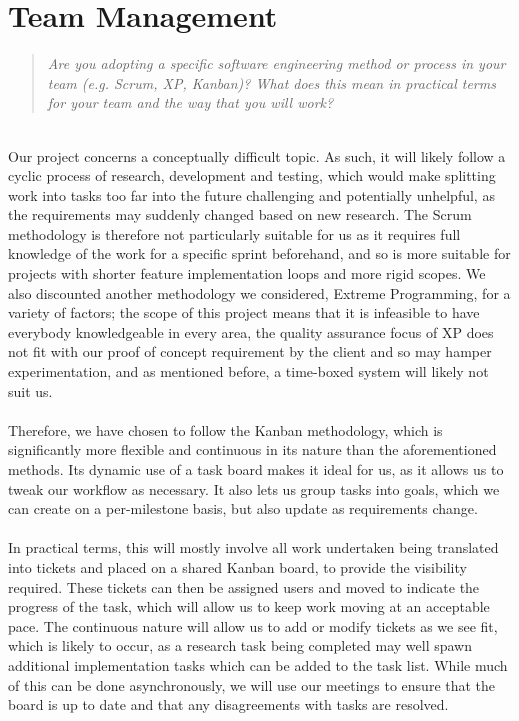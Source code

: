 \documentclass{report}
\newcommand{\teamq}[1]{\begin{quote}
    \large\textit{#1}
\end{quote}}
\begin{document}
\section*{Team Management}
\teamq{Are you adopting a specific software engineering method or process in your team (e.g. Scrum, XP, Kanban)? What does this mean in practical terms for your team and the way that you will work?}
\\
Our project concerns a conceptually difficult topic. As such, it will likely follow a cyclic process of research, development and testing, which would make splitting work into tasks too far into the future challenging and potentially unhelpful, as the requirements may suddenly changed based on new research. The Scrum methodology is therefore not particularly suitable for us as it requires full knowledge of the work for a specific sprint beforehand, and so is more suitable for projects with shorter feature implementation loops and more rigid scopes. We also discounted another methodology we considered, Extreme Programming, for a variety of factors; the scope of this project means that it is infeasible to have everybody knowledgeable in every area, the quality assurance focus of XP does not fit with our proof of concept requirement by the client and so may hamper experimentation, and as mentioned before, a time-boxed system will likely not suit us.
\\
\\ Therefore, we have chosen to follow the Kanban methodology, which is significantly more flexible and continuous in its nature than the aforementioned methods. Its dynamic use of a task board makes it ideal for us, as it allows us to tweak our workflow as necessary. It also lets us group tasks into goals, which we can create on a per-milestone basis, but also update as requirements change.
\\
\\In practical terms, this will mostly involve all work undertaken being translated into tickets and placed on a shared Kanban board, to provide the visibility required. These tickets can then be assigned users and moved to indicate the progress of the task, which will allow us to keep work moving at an acceptable pace. The continuous nature will allow us to add or modify tickets as we see fit, which is likely to occur, as a research task being completed may well spawn additional implementation tasks which can be added to the task list. While much of this can be done asynchronously, we will use our meetings to ensure that the board is up to date and that any disagreements with tasks are resolved.
\end{document}
